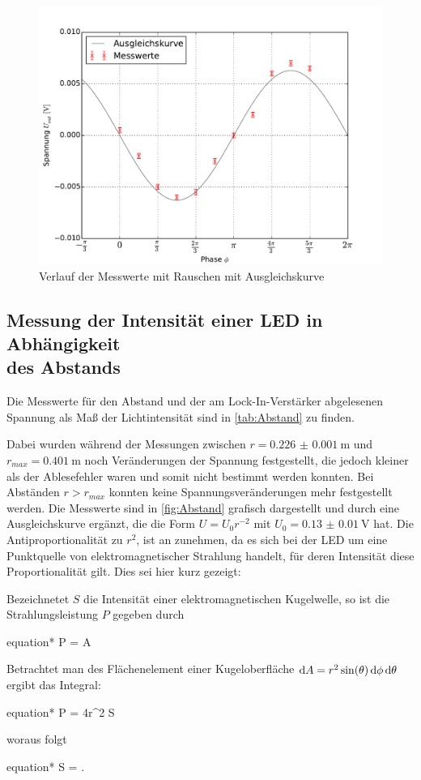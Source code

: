 	\begin{figure}[!h]
		\centering
		\includegraphics[scale=0.75]{Grafiken/MitNoise.pdf}
		\caption{Verlauf der Messwerte mit Rauschen mit Ausgleichskurve}
		\label{fig:mitNoise}
	\end{figure} 
\subsection{Messung der Intensität einer LED in Abhängigkeit  \\des Abstands} \label{sec:Abstand}
	Die Messwerte für den Abstand und der am Lock-In-Verstärker abgelesenen Spannung als Maß der Lichtintensität
	sind in \cref{tab:Abstand} zu finden. 
	
	
	
	Dabei wurden während der Messungen zwischen $r = \SI{0.226(1)}{\meter}$ und $r_{max} = \SI{0.401}{\meter}$ 
	noch Veränderungen der Spannung festgestellt, die jedoch kleiner als der Ablesefehler waren und somit nicht bestimmt
	werden konnten. Bei Abständen $r > r_{max}$ konnten keine Spannungsveränderungen mehr festgestellt werden.
	Die Messwerte sind in \cref{fig:Abstand} grafisch dargestellt und durch eine Ausgleichskurve ergänzt, die 
	die Form $U = U_{0}r^{-2}$ mit $U_{0}= \SI{0.13(1)}{\volt}$ hat. Die Antiproportionalität zu $r^{2}$, ist an
	zunehmen, da es sich bei der LED um eine Punktquelle von elektromagnetischer Strahlung handelt, für deren Intensität
	diese Proportionalität gilt. Dies sei hier kurz gezeigt:
	
	Bezeichnetet $S$ die Intensität einer elektromagnetischen Kugelwelle, so ist die Strahlungsleistung $P$ gegeben durch
	\begin{empheq}{equation*}
		P = \dif A
	\end{empheq}    
	Betrachtet man des Flächenelement einer Kugeloberfläche $\dif A = r^{2} \sin(\theta) \dif\phi \dif\theta$ ergibt das Integral:
	\begin{empheq}{equation*}
	 	P =  4\pi r^{2} \cdot S
	\end{empheq}  
	woraus folgt
	\begin{empheq}{equation*}
	 	S =  \propto {}.
	\end{empheq} 
	
